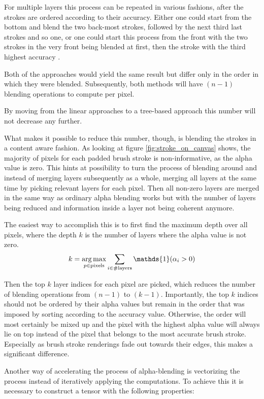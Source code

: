 For multiple layers this process can be repeated in various fashions, after the strokes
are ordered according to their accuracy.
Either one could start from the bottom and blend the two back-most strokes, followed
by the next third last strokes and so one, or one could start this process from
the front with the two strokes in the very front being blended at first, then the
stroke with the third highest accuracy \etc.

Both of the approaches would yield the same result but differ only in the order in
which they were blended.
Subsequently, both methods will have $(n-1)$ blending operations to compute per pixel.

By moving from the linear approaches to a tree-based approach this number will not
decrease any further.

What makes it possible to reduce this number, though, is blending the strokes in 
a content aware fashion.
As looking at figure \ref{fig:stroke_on_canvas} shows, the majority of pixels for
each padded brush stroke is non-informative, as the alpha value is zero.
This hints at possibility to turn the process of blending around and instead of merging
layers subsequently as a whole, merging all layers at the same time by picking relevant
layers for each pixel.
Then all non-zero layers are merged in the same way as ordinary alpha blending works
but with the number of layers being reduced and information inside a layer not being
coherent anymore.


The easiest way to accomplish this is to first find the maximum depth over all pixels,
where the depth $k$ is the number of layers where the alpha value is not zero.
\begin{align}
    k = \argmax_{p \in \text{pixels}} \sum_{i \in \# \text{layers}} \mathds{1}(\alpha_i > 0)
\end{align}

Then the top $k$ layer indices for each pixel are picked, which reduces the number
of blending operations from $(n-1)$ to $(k-1)$.
Importantly, the top $k$ indices should not be ordered by their alpha values but
remain in the order that was imposed by sorting according to the accuracy value.
Otherwise, the order will most certainly be mixed up and the pixel with the highest
alpha value will always lie on top instead of the pixel that belongs to the most
accurate brush stroke.
Especially as brush stroke renderings fade out towards their edges, this makes a
significant difference.


Another way of accelerating the process of alpha-blending is vectorizing the process
instead of iteratively applying the computations.
To achieve this it is necessary to construct a tensor with the following properties:

